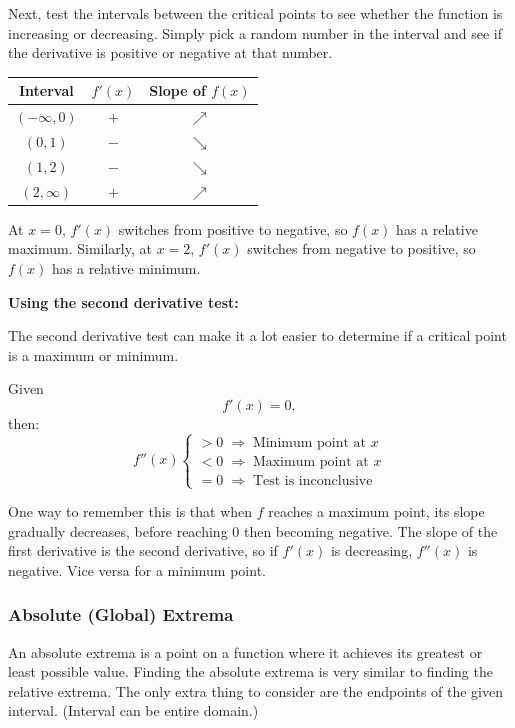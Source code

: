 \documentclass[12pt]{article}
\begin{document}
Next, test the intervals between the critical points to see whether the function is increasing or decreasing. Simply pick a random number in the interval and see if the derivative is positive or negative at that number.
\begin{center}
    \begin{tabular}{|c|c|c|}
        \hline
        Interval       & $f'(x)$ & Slope of $f(x)$ \\
        \hline \hline
        $(-\infty, 0)$ & $+$     & $\nearrow$      \\
        \hline
        $(0, 1)$       & $-$     & $\searrow$      \\
        \hline
        $(1, 2)$       & $-$     & $\searrow$      \\
        \hline
        $(2, \infty)$  & $+$     & $\nearrow$      \\
        \hline
    \end{tabular}
\end{center}

At $x=0$, $f'(x)$ switches from positive to negative, so $f(x)$ has a relative maximum. Similarly, at $x=2$, $f'(x)$ switches from negative to positive, so $f(x)$ has a relative minimum.

\noindent \textbf{Using the second derivative test:}

The second derivative test can make it a lot easier to determine if a critical point is a maximum or minimum.

\noindent Given
\[ f'(x) = 0, \]
then:
\[ f''(x) \begin{cases}
        >0 \; \Rightarrow \; \text{Minimum point at $x$} \\
        <0 \; \Rightarrow \; \text{Maximum point at $x$} \\
        =0 \; \Rightarrow \; \text{Test is inconclusive}
    \end{cases} \]

One way to remember this is that when $f$ reaches a maximum point, its slope gradually decreases, before reaching $0$ then becoming negative. The slope of the first derivative is the second derivative, so if $f'(x)$ is decreasing, $f''(x)$ is negative. Vice versa for a minimum point.

\subsubsection{Absolute (Global) Extrema}
An absolute extrema is a point on a function where it achieves its greatest or least possible value. Finding the absolute extrema is very similar to finding the relative extrema. The only extra thing to consider are the endpoints of the given interval. (Interval can be entire domain.)
\end{document}
